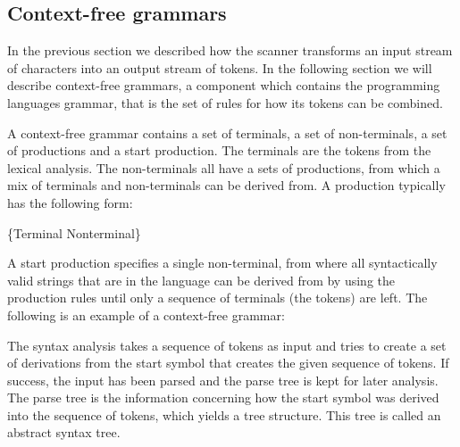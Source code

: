\subsection{Context-free grammars}
\label{sec:context-freegrammars}
In the previous section we described how the scanner transforms an input stream of
characters into an output stream of tokens. In the following section we
will describe context-free grammars, a component which contains the programming
languages grammar, that is the set of rules for how its tokens can be
combined.

A context-free grammar contains a set of terminals, a set of non-terminals, a
set of productions and a start production. The terminals are the tokens from the
lexical analysis. The non-terminals all have a sets of productions, from which a
mix of terminals and non-terminals can be derived from. A production typically
has the following form:

\begin{ebnf}
 {\{Terminal \gor \gcat Nonterminal\}}
\end{ebnf}

A start production specifies a single non-terminal, from where all syntactically
valid strings that are in the language can be derived from by using the
production rules until only a sequence of terminals (the tokens) are left. The
following is an example of a context-free grammar: 

\begin{ebnf}
\galt{\gter{>}}
\galt{\gter{<}}
\end{ebnf}

The syntax analysis takes a sequence of tokens as input and tries to create a
set of derivations from the start symbol that creates the given sequence of
tokens. If success, the input has been parsed and the parse tree is kept for
later analysis. The parse tree is the information concerning how the start
symbol was derived into the sequence of tokens, which yields a tree structure.
This tree is called an abstract syntax tree.

